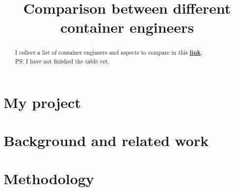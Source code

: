 \documentclass[USenglish]{ttm4502}
\begin{document}
\title{Comparison between different container engineers}
\maketitle

\begin{abstract}
% 
I collect a list of container engineers and aspects to compare in this \textbf{\href{https://htmlpreview.github.io/?https://raw.githubusercontent.com/namnx228/Thesis-NTNU/master/table.html}{link}}.\\
PS: I have not finished the table yet.
\end{abstract}

\section{My project}
\label{sec:my_project}

\section{Background and related work}
\label{sec:background_and_related_work}

\cite{Author:year:XYZ} %

\section{Methodology}
\label{sec:methodology}
\end{document}
